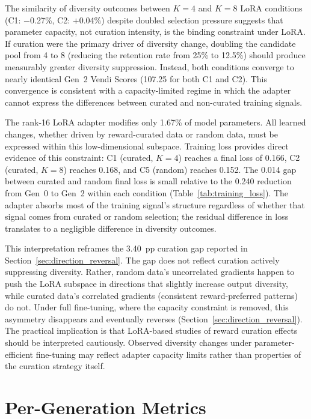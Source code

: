 The similarity of diversity outcomes between $K{=}4$ and $K{=}8$ LoRA conditions (C1: $-$0.27\%, C2: $+$0.04\%) despite doubled selection pressure suggests that parameter capacity, not curation intensity, is the binding constraint under LoRA. If curation were the primary driver of diversity change, doubling the candidate pool from 4 to 8 (reducing the retention rate from 25\% to 12.5\%) should produce measurably greater diversity suppression. Instead, both conditions converge to nearly identical Gen~2 Vendi Scores (107.25 for both C1 and C2). This convergence is consistent with a capacity-limited regime in which the adapter cannot express the differences between curated and non-curated training signals.

The rank-16 LoRA adapter modifies only 1.67\% of model parameters. All learned changes, whether driven by reward-curated data or random data, must be expressed within this low-dimensional subspace. Training loss provides direct evidence of this constraint: C1 (curated, $K{=}4$) reaches a final loss of 0.166, C2 (curated, $K{=}8$) reaches 0.168, and C5 (random) reaches 0.152. The 0.014 gap between curated and random final loss is small relative to the 0.240 reduction from Gen~0 to Gen~2 within each condition (Table~\ref{tab:training_loss}). The adapter absorbs most of the training signal's structure regardless of whether that signal comes from curated or random selection; the residual difference in loss translates to a negligible difference in diversity outcomes.

This interpretation reframes the 3.40~pp curation gap reported in Section~\ref{sec:direction_reversal}. The gap does not reflect curation actively suppressing diversity. Rather, random data's uncorrelated gradients happen to push the LoRA subspace in directions that slightly increase output diversity, while curated data's correlated gradients (consistent reward-preferred patterns) do not. Under full fine-tuning, where the capacity constraint is removed, this asymmetry disappears and eventually reverses (Section~\ref{sec:direction_reversal}). The practical implication is that LoRA-based studies of reward curation effects should be interpreted cautiously. Observed diversity changes under parameter-efficient fine-tuning may reflect adapter capacity limits rather than properties of the curation strategy itself.

\section{Per-Generation Metrics}
\label{app:per_gen_metrics}

